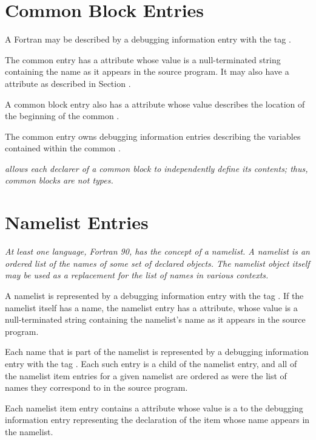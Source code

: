 \section{Common Block Entries}
\label{chap:commonblockentries}
A Fortran 
may 
be described by a debugging information entry with the 
tag \DWTAGcommonblockTARG. 

The common  
entry has a \DWATname{} attribute 
whose value is a null-terminated
string containing the
name as it appears in the source program. It may also have a
\DWATlinkagename{} attribute as described in 
Section . 

A common block entry also has a \DWATlocation{} attribute
whose value describes the
location of the beginning of the common . 

The common
 entry owns debugging information entries describing
the variables contained within the common .

\textit{ allows each declarer of a common block 
to independently define its contents; thus, common blocks are not types.}

\section{Namelist Entries}
\label{chap:namelistentries}
\textit{At least one language, Fortran 90, has the concept of a
namelist. A namelist is an ordered list of the names of some
set of declared objects. The namelist object itself may be used
as a replacement for the list of names in various contexts.}

A namelist is represented by a debugging information entry
with the 
tag \DWTAGnamelistTARG. 
If the namelist itself has a
name, the namelist entry has a \DWATname{} attribute,
whose value is a null-terminated
string containing the namelist\textquoteright{}s
name as it appears in the source program.

Each 
\hypertarget{chap:DWATnamelistitemnamelistitem}{}
name that is part of the namelist is represented
by a debugging information entry with the tag
\DWTAGnamelistitemTARG. 
Each such entry is a child of the
namelist entry, and all of the 
namelist item entries for a
given namelist are ordered as were the list of names they
correspond to in the source program.

Each namelist item entry contains a 
\DWATnamelistitemDEFN{} attribute
whose 
value is a  to the debugging
information entry representing the declaration of the item
whose name appears in the namelist.


